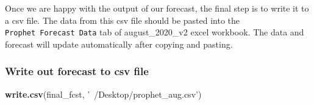 \documentclass[]{article}
\newenvironment{Shaded}{\begin{snugshade}}{\end{snugshade}}
\newcommand{\KeywordTok}[1]{\textcolor[rgb]{0.13,0.29,0.53}{\textbf{{#1}}}}
\newcommand{\StringTok}[1]{\textcolor[rgb]{0.31,0.60,0.02}{{#1}}}
\newcommand{\CommentTok}[1]{\textcolor[rgb]{0.56,0.35,0.01}{\textit{{#1}}}}
\newcommand{\NormalTok}[1]{{#1}}
\begin{document}
\begin{Shaded}
\end{Shaded}

Once we are happy with the output of our forecast, the final step is to
write it to a csv file. The data from this csv file should be pasted
into the \texttt{Prophet\ Forecast\ Data} tab of august\_2020\_v2 excel
workbook. The data and forecast will update automatically after copying
and pasting.

\subsubsection{Write out forecast to csv
file}\label{write-out-forecast-to-csv-file}

\begin{Shaded}
\begin{Highlighting}[]
\KeywordTok{write.csv}\NormalTok{(final_fcst, }\StringTok{'~/Desktop/prophet_aug.csv'}\NormalTok{)}
\end{Highlighting}
\end{Shaded}
\end{document}
